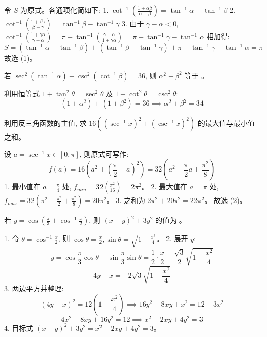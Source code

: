 \begin{questions}
\begin{solution}
令 $S$ 为原式。各通项化简如下:
1. $\cot^{-1}\left(\frac{1+\alpha\beta}{\alpha-\beta}\right) = \tan^{-1}\alpha - \tan^{-1}\beta$
2. $\cot^{-1}\left(\frac{1+\beta\gamma}{\beta-\gamma}\right) = \tan^{-1}\beta - \tan^{-1}\gamma$
3. 由于 $\gamma-\alpha < 0$, $\cot^{-1}\left(\frac{1+\gamma\alpha}{\gamma-\alpha}\right) = \pi + \tan^{-1}\left(\frac{\gamma-\alpha}{1+\gamma\alpha}\right) = \pi + \tan^{-1}\gamma - \tan^{-1}\alpha$
相加得:
\[ S = (\tan^{-1}\alpha - \tan^{-1}\beta) + (\tan^{-1}\beta - \tan^{-1}\gamma) + \pi + \tan^{-1}\gamma - \tan^{-1}\alpha = \pi \]
故选 (1)。
\end{solution}

\question
若 $\sec^2(\tan^{-1}\alpha) + \csc^2(\cot^{-1}\beta) = 36$, 则 $\alpha^2 + \beta^2$ 等于 \underline{\quad}。

\begin{solution}
利用恒等式 $1 + \tan^2\theta = \sec^2\theta$ 及 $1 + \cot^2\theta = \csc^2\theta$:
\[ (1 + \alpha^2) + (1 + \beta^2) = 36 \implies \alpha^2 + \beta^2 = 34 \]
\end{solution}

\question
利用反三角函数的主值, 求 $16 \left( (\sec^{-1}x)^2 + (\csc^{-1}x)^2 \right)$ 的最大值与最小值之和。

\begin{solution}
设 $a = \sec^{-1}x \in [0, \pi]$, 则原式可写作:
\[ f(a) = 16\left(a^2 + \left(\frac{\pi}{2}-a\right)^2\right) = 32\left(a^2 - \frac{\pi}{2}a + \frac{\pi^2}{8}\right) \]
1. 最小值在 $a = \frac{\pi}{4}$ 处, $f_{min} = 32\left(\frac{\pi^2}{16}\right) = 2\pi^2$。
2. 最大值在 $a = \pi$ 处, $f_{max} = 32\left(\pi^2 - \frac{\pi^2}{2} + \frac{\pi^2}{8}\right) = 20\pi^2$。
3. 之和为 $2\pi^2 + 20\pi^2 = 22\pi^2$。
故选 (2)。
\end{solution}

\question
若 $y = \cos \left( \frac{\pi}{3} + \cos^{-1}\frac{x}{2} \right)$, 则 $(x-y)^2 + 3y^2$ 的值为 \underline{\quad}。

\begin{solution}
1. 令 $\theta = \cos^{-1}\frac{x}{2}$, 则 $\cos\theta = \frac{x}{2}, \sin\theta = \sqrt{1 - \frac{x^2}{4}}$。
2. 展开 $y$:
\[ y = \cos\frac{\pi}{3}\cos\theta - \sin\frac{\pi}{3}\sin\theta = \frac{1}{2} \cdot \frac{x}{2} - \frac{\sqrt{3}}{2}\sqrt{1 - \frac{x^2}{4}} \]
\[ 4y - x = -2\sqrt{3}\sqrt{1 - \frac{x^2}{4}} \]
3. 两边平方并整理:
\[ (4y-x)^2 = 12(1 - \frac{x^2}{4}) \implies 16y^2 - 8xy + x^2 = 12 - 3x^2 \]
\[ 4x^2 - 8xy + 16y^2 = 12 \implies x^2 - 2xy + 4y^2 = 3 \]
4. 目标式 $(x-y)^2 + 3y^2 = x^2 - 2xy + 4y^2 = 3$。
\end{solution}


\end{questions}
